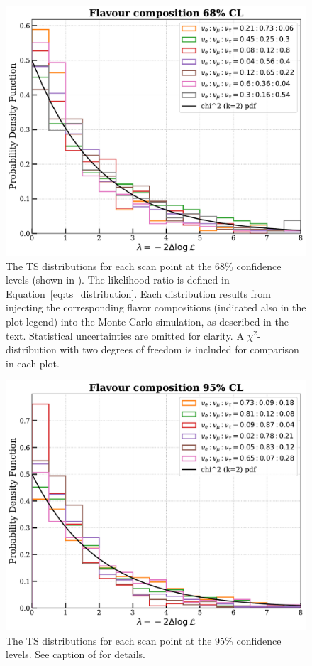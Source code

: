 \begin{figure}[h!]
    
    \includegraphics{./figures/results/wilkscheck_68CL.pdf}


    \caption{The TS distributions for each scan point at the 68\% confidence levels (shown in ). The likelihood ratio is defined in Equation~\ref{eq:ts_distribution}. Each distribution results from injecting the corresponding flavor compositions (indicated also in the plot legend) into the Monte Carlo simulation, as described in the text. Statistical uncertainties are omitted for clarity. A $\chi^2$-distribution with two degrees of freedom is included for comparison in each plot.}
\end{figure}

\begin{figure}[h!]
    
    \includegraphics{./figures/results/wilkscheck_95CL.pdf}


    \caption{The TS distributions for each scan point at the 95\% confidence levels. See caption of  for details.}
\end{figure}

